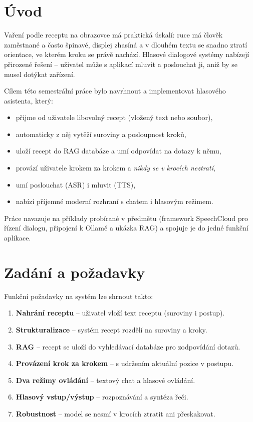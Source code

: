 \documentclass[11pt,a4paper]{article}
\begin{document}
\tableofcontents
\newpage

\section{Úvod}
Vaření podle receptu na obrazovce má praktická úskalí: ruce má člověk zaměstnané
a často špinavé, displej zhasíná a v dlouhém textu se snadno ztratí orientace,
ve kterém kroku se právě nachází. Hlasové dialogové systémy nabízejí přirozené
řešení -- uživatel může s aplikací mluvit a poslouchat ji, aniž by se musel
dotýkat zařízení.

Cílem této semestrální práce bylo navrhnout a implementovat hlasového asistenta,
který:
\begin{itemize}[noitemsep]
  \item přijme od uživatele libovolný recept (vložený text nebo soubor),
  \item automaticky z něj vytěží suroviny a posloupnost kroků,
  \item uloží recept do RAG databáze a umí odpovídat na dotazy k němu,
  \item provází uživatele krokem za krokem a \emph{nikdy se v krocích neztratí},
  \item umí poslouchat (ASR) i mluvit (TTS),
  \item nabízí příjemné moderní rozhraní s chatem i hlasovým režimem.
\end{itemize}

Práce navazuje na příklady probírané v předmětu (framework SpeechCloud pro řízení
dialogu, připojení k Ollamě a ukázka RAG) a spojuje je do jedné funkční aplikace.

\section{Zadání a požadavky}
Funkční požadavky na systém lze shrnout takto:
\begin{enumerate}[noitemsep]
  \item \textbf{Nahrání receptu} -- uživatel vloží text receptu (suroviny i postup).
  \item \textbf{Strukturalizace} -- systém recept rozdělí na suroviny a kroky.
  \item \textbf{RAG} -- recept se uloží do vyhledávací databáze pro zodpovídání dotazů.
  \item \textbf{Provázení krok za krokem} -- s udržením aktuální pozice v postupu.
  \item \textbf{Dva režimy ovládání} -- textový chat a hlasové ovládání.
  \item \textbf{Hlasový vstup/výstup} -- rozpoznávání a syntéza řeči.
  \item \textbf{Robustnost} -- model se nesmí v krocích ztratit ani přeskakovat.
\end{enumerate}
\end{document}
